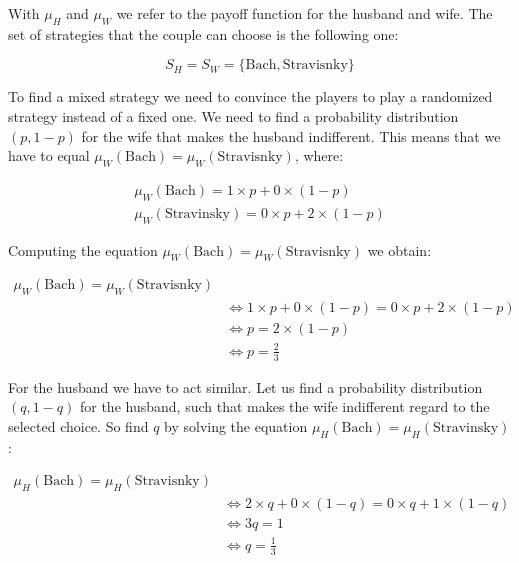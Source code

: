 \documentclass{article}
\begin{document}
\noindent With $\mu_{H}$ and $\mu_{W}$ we refer to the payoff function for the husband and wife. The set of strategies 
that the couple can choose is the following one:

\begin{equation*}
    S_{H} = S_{W} = \{\textrm{Bach}, \textrm{Stravisnky}\}
\end{equation*}

\noindent To find a mixed strategy we need to convince the players to play a randomized strategy instead of a fixed one.
We need to find a probability distribution $(p, 1 - p)$ for the wife that makes the husband indifferent. This means that we have to
equal $\mu_W(\textrm{Bach}) = \mu_W(\textrm{Stravisnky})$, where:

\begin{align*}
    \mu_W(\textrm{Bach}) = 1 \times p + 0 \times (1 - p) \\
    \mu_W(\textrm{Stravinsky}) = 0 \times p + 2 \times (1 - p)
\end{align*}

\noindent Computing the equation $\mu_W(\textrm{Bach}) = \mu_W(\textrm{Stravisnky})$ we obtain:

\begin{equation*}
    \begin{split}
        \mu_W(\textrm{Bach}) = \mu_W(\textrm{Stravisnky}) \\
            & \iff 1 \times p + 0 \times (1 - p) = 0 \times p + 2 \times (1 - p) \\
            & \iff p = 2 \times (1-p) \\
            & \iff p = \frac{2}{3}
    \end{split}
\end{equation*}

\noindent For the husband we have to act similar. Let us find a probability distribution $(q, 1- q)$ for the husband,
such that makes the wife indifferent regard to the selected choice. So find $q$ by solving the equation $\mu_H(\textrm{Bach}) = \mu_H(\textrm{Stravinsky})$:

\begin{equation*}
    \begin{split}
        \mu_H(\textrm{Bach}) = \mu_H(\textrm{Stravisnky}) \\
            & \iff 2 \times q + 0 \times (1 - q) = 0 \times q + 1 \times (1-q) \\
            & \iff 3q = 1 \\
            & \iff q = \frac{1}{3}
    \end{split}
\end{equation*}
\end{document}
